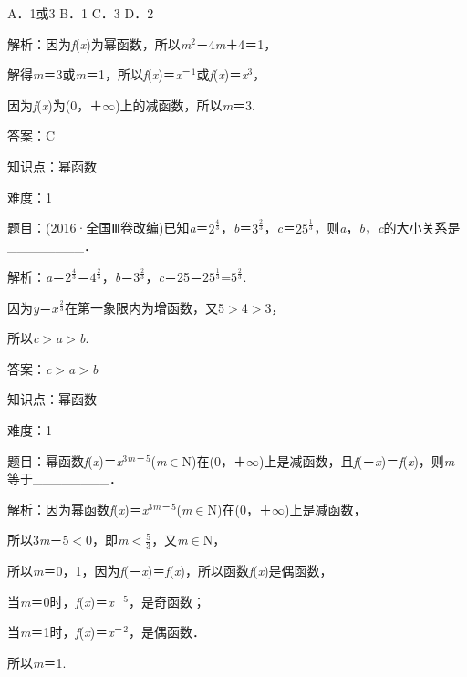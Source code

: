 \documentclass{article} %
\begin{document}
A．1或3  B．1  C．3  D．2

解析：因为\textit{f}(\textit{x})为幂函数，所以\textit{m}${}^{2}$－4\textit{m}＋4＝1，

解得\textit{m}＝3或\textit{m}＝1，所以\textit{f}(\textit{x})＝\textit{x}${}^{\textrm{－}}$${}^{1}$或\textit{f}(\textit{x})＝\textit{x}${}^{3}$，

因为\textit{f}(\textit{x})为(0，＋$\mathrm{\infty}$)上的减函数，所以\textit{m}＝3.

答案：C

知识点：幂函数

难度：1

题目：(2016·全国Ⅲ卷改编)已知\textit{a}＝$2^{\frac{4}{3}}$，\textit{b}＝$3^{\frac{2}{3}}$，\textit{c}＝$25^{\frac{1}{3}}$，则\textit{a}，\textit{b}，\textit{c}的大小关系是\_\_\_\_\_\_\_\_．

解析：\textit{a}＝$2^{\frac{4}{3}}$＝$4^{\frac{2}{3}}$，\textit{b}＝$3^{\frac{2}{3}}$，\textit{c}＝25＝$25^{\frac{1}{3}}$=$5^{\frac{2}{3}}$.

因为\textit{y}＝$x^{\frac{2}{3}}$在第一象限内为增函数，又5$\mathrm{>}$4$\mathrm{>}$3，

所以\textit{c}$\mathrm{>}$\textit{a}$\mathrm{>}$\textit{b}.

答案：\textit{c}$\mathrm{>}$\textit{a}$\mathrm{>}$\textit{b}

知识点：幂函数

难度：1

题目：幂函数\textit{f}(\textit{x})＝\textit{x}${}^{3}$\textit{${}^{m}$}${}^{\textrm{－}}$${}^{5}$(\textit{m}$\mathrm{\in}$N)在(0，＋$\mathrm{\infty}$)上是减函数，且\textit{f}(－\textit{x})＝\textit{f}(\textit{x})，则\textit{m}等于\_\_\_\_\_\_\_\_．

解析：因为幂函数\textit{f}(\textit{x})＝\textit{x}${}^{3}$\textit{${}^{m}$}${}^{\textrm{－}}$${}^{5}$(\textit{m}$\mathrm{\in}$N)在(0，＋$\mathrm{\infty}$)上是减函数，

所以3\textit{m}－5$\mathrm{<}$0，即\textit{m}$\mathrm{<}$$\frac{5}{3}$，又\textit{m}$\mathrm{\in}$N，

所以\textit{m}＝0，1，因为\textit{f}(－\textit{x})＝\textit{f}(\textit{x})，所以函数\textit{f}(\textit{x})是偶函数，

当\textit{m}＝0时，\textit{f}(\textit{x})＝\textit{x}${}^{\textrm{－}}$${}^{5}$，是奇函数；

当\textit{m}＝1时，\textit{f}(\textit{x})＝\textit{x}${}^{\textrm{－}}$${}^{2}$，是偶函数．

所以\textit{m}＝1.
\end{document}

